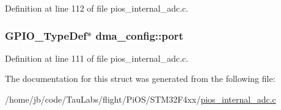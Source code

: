 \-Definition at line 112 of file pios\-\_\-internal\-\_\-adc.\-c.

\hypertarget{structdma__config_a6cbbf1d4f1761343da79031c358d28da}{
\subsubsection[{port}]{\setlength{\rightskip}{0pt plus 5cm}\-G\-P\-I\-O\-\_\-\-Type\-Def$\ast$ {\bf dma\-\_\-config\-::port}}}\label{structdma__config_a6cbbf1d4f1761343da79031c358d28da}


\-Definition at line 111 of file pios\-\_\-internal\-\_\-adc.\-c.



\-The documentation for this struct was generated from the following file\-:\begin{DoxyCompactItemize}
\item 
/home/jb/code/\-Tau\-Labs/flight/\-Pi\-O\-S/\-S\-T\-M32\-F4xx/\hyperlink{_s_t_m32_f4xx_2pios__internal__adc_8c}{pios\-\_\-internal\-\_\-adc.\-c}\end{DoxyCompactItemize}
